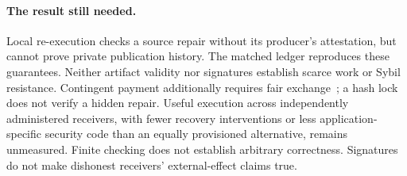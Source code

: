 \paragraph{The result still needed.}
Local re-execution checks a source repair without its producer's attestation,
but cannot prove private publication history. The matched ledger reproduces
these guarantees. Neither artifact validity nor signatures establish scarce
work or Sybil resistance.
Contingent payment additionally requires fair exchange~\cite{zkcp2017}; a hash
lock does not verify a hidden repair.
Useful execution across independently administered receivers, with fewer
recovery interventions or less application-specific security code than an
equally provisioned alternative, remains unmeasured. Finite checking does not
establish arbitrary correctness. Signatures do not make dishonest receivers'
external-effect claims true.
